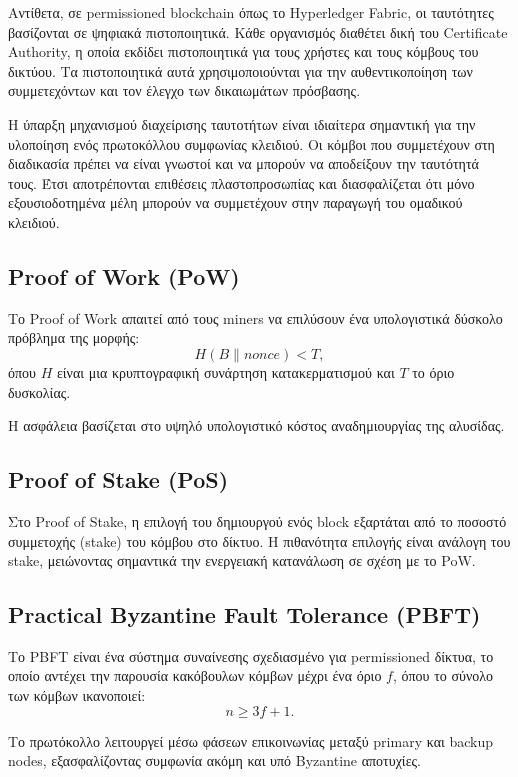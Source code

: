 \documentclass[12pt,a4paper]{report}
\begin{document}
Αντίθετα, σε permissioned blockchain όπως το Hyperledger Fabric, οι ταυτότητες βασίζονται σε ψηφιακά πιστοποιητικά. Κάθε οργανισμός διαθέτει δική του Certificate Authority, η οποία εκδίδει πιστοποιητικά για τους χρήστες και τους κόμβους του δικτύου. Τα πιστοποιητικά αυτά χρησιμοποιούνται για την αυθεντικοποίηση των συμμετεχόντων και τον έλεγχο των δικαιωμάτων πρόσβασης.

Η ύπαρξη μηχανισμού διαχείρισης ταυτοτήτων είναι ιδιαίτερα σημαντική για την υλοποίηση ενός πρωτοκόλλου συμφωνίας κλειδιού. Οι κόμβοι που συμμετέχουν στη διαδικασία πρέπει να είναι γνωστοί και να μπορούν να αποδείξουν την ταυτότητά τους. Έτσι αποτρέπονται επιθέσεις πλαστοπροσωπίας και διασφαλίζεται ότι μόνο εξουσιοδοτημένα μέλη μπορούν να συμμετέχουν στην παραγωγή του ομαδικού κλειδιού.


\subsection{Proof of Work (PoW)}

Το Proof of Work απαιτεί από τους miners να επιλύσουν ένα υπολογιστικά δύσκολο πρόβλημα της μορφής:
\[
H(B \parallel nonce) < T,
\]
όπου $H$ είναι μια κρυπτογραφική συνάρτηση κατακερματισμού και $T$ το όριο δυσκολίας.

Η ασφάλεια βασίζεται στο υψηλό υπολογιστικό κόστος αναδημιουργίας της αλυσίδας.

\subsection{Proof of Stake (PoS)}

Στο Proof of Stake, η επιλογή του δημιουργού ενός block εξαρτάται από το ποσοστό συμμετοχής (stake) του κόμβου στο δίκτυο. Η πιθανότητα επιλογής είναι ανάλογη του stake, μειώνοντας σημαντικά την ενεργειακή κατανάλωση σε σχέση με το PoW.

\subsection{Practical Byzantine Fault Tolerance (PBFT)}

Το PBFT είναι ένα σύστημα συναίνεσης σχεδιασμένο για permissioned δίκτυα, το οποίο αντέχει την παρουσία κακόβουλων κόμβων μέχρι ένα όριο $f$, όπου το σύνολο των κόμβων ικανοποιεί:
\[
n \ge 3f + 1.
\]

Το πρωτόκολλο λειτουργεί μέσω φάσεων επικοινωνίας μεταξύ primary και backup nodes, εξασφαλίζοντας συμφωνία ακόμη και υπό Byzantine αποτυχίες.
\end{document}
